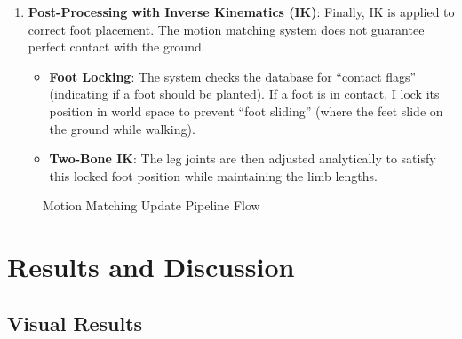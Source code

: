 \documentclass[8pt,a4paper]{extarticle}
\begin{document}
\begin{enumerate}
    \item \textbf{Post-Processing with Inverse Kinematics (IK)}:
          Finally, IK is applied to correct foot placement. The motion matching system does not guarantee perfect contact with the ground.
          \begin{itemize}
              \item \textbf{Foot Locking}: The system checks the database for ``contact flags'' (indicating if a foot should be planted). If a foot is in contact, I lock its position in world space to prevent ``foot sliding'' (where the feet slide on the ground while walking).
              \item \textbf{Two-Bone IK}: The leg joints are then adjusted analytically to satisfy this locked foot position while maintaining the limb lengths.
          \end{itemize}
\end{enumerate}

\begin{figure}[h!]
    \centering
    \caption{Motion Matching Update Pipeline Flow}
    \label{fig:mm_pipeline_flow}
\end{figure}


\section{Results and Discussion}

\subsection{Visual Results}
\end{document}
